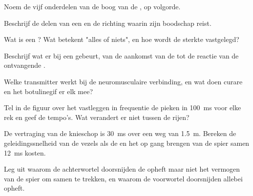 \begin{exercise}[$\star$]\label{exo:g12:stretch-reflex:1}
Noem de vijf onderdelen van de boog van de , op volgorde.
\end{exercise}

\begin{exercise}[$\star$]\label{exo:g12:stretch-reflex:2}
Beschrijf de delen van een  en de richting waarin zijn boodschap
reist.
\end{exercise}

\begin{exercise}[$\star$]\label{exo:g12:stretch-reflex:3}
Wat is een ? Wat betekent "alles of niets", en hoe wordt de
sterkte vastgelegd?
\end{exercise}

\begin{exercise}[$\star$]\label{exo:g12:stretch-reflex:4}
Beschrijf wat er bij een  gebeurt, van de aankomst van de
 tot de reactie van de ontvangende .
\end{exercise}

\begin{exercise}[$\star$]\label{exo:g12:stretch-reflex:5}
Welke transmitter werkt bij de neuromusculaire verbinding, en wat doen
curare en het botulinegif er elk mee?
\end{exercise}

\begin{exercise}[$\star\star$]\label{exo:g12:stretch-reflex:6}
Tel in de figuur over het vastleggen in frequentie de pieken in
\qty{100}{ms} voor elke rek en geef de tempo's. Wat verandert er niet
tussen de rijen?
\end{exercise}

\begin{exercise}[$\star\star$]\label{exo:g12:stretch-reflex:7}
De vertraging van de knieschop is \qty{30}{ms} over een weg van
\qty{1.5}{m}. Bereken de geleidingssnelheid van de vezels als de  en
het op gang brengen van de spier samen \qty{12}{ms} kosten.
\end{exercise}

\begin{exercise}[$\star\star$]\label{exo:g12:stretch-reflex:8}
Leg uit waarom de achterwortel doorsnijden de  opheft maar niet het
vermogen van de spier om samen te trekken, en waarom de voorwortel
doorsnijden allebei opheft.
\end{exercise}

